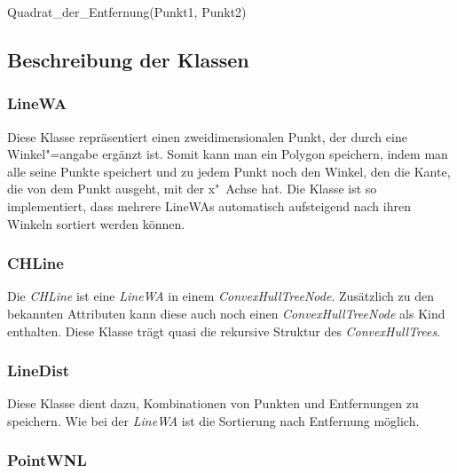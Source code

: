 \begin{function}[!ht]
	\caption{Quadrat\_der\_Entfernung(Punkt1, Punkt2)}
\end{function}


\clearpage
\subsection{Beschreibung der Klassen}\label{klassen}

\subsubsection{LineWA}\label{LineWA}

Diese Klasse repräsentiert einen zweidimensionalen Punkt, der durch eine Winkel"=angabe ergänzt ist. Somit kann man ein Polygon speichern, indem man alle seine Punkte speichert und zu jedem Punkt noch den Winkel, den die Kante, die von dem Punkt ausgeht, mit der x"~Achse hat. Die Klasse ist so implementiert, dass mehrere LineWAs automatisch aufsteigend nach ihren Winkeln sortiert werden können.

\subsubsection{CHLine}

Die \textit{CHLine} ist eine \textit{LineWA} in einem \textit{ConvexHullTreeNode}. Zusätzlich zu den bekannten Attributen kann diese auch noch einen \textit{ConvexHullTreeNode} als Kind enthalten. Diese Klasse trägt quasi die rekursive Struktur des \textit{ConvexHullTrees}.

\subsubsection{LineDist}

Diese Klasse dient dazu, Kombinationen von Punkten und Entfernungen zu  speichern. Wie bei der \textit{LineWA} ist die Sortierung nach Entfernung möglich.

\subsubsection{PointWNL}

